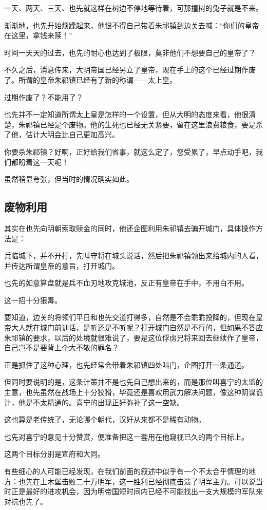 \begin{multicols}{\theparacolNo}
一天、两天、三天、也先就这样在树边不停地等待着，可那撞树的兔子就是不来。

渐渐地，也先开始烦躁起来，他恨不得自己带着朱祁镇到边关去喊：“你们的皇帝在这里，拿钱来赎！”

时间一天天的过去，也先的耐心也达到了极限，莫非他们不想要自己的皇帝了？

不久之后，消息传来，大明帝国已经另立了皇帝，现在手上的这个已经过期作废了。所谓的皇帝朱祁镇已经有了新的称谓——太上皇。

过期作废了？不能用了？

也先并不一定知道所谓太上皇是怎样的一个设置，但从大明的态度来看，他很清楚，朱祁镇已经是个废物。他的生死也已经无关紧要，留在这里浪费粮食，要是杀了他，估计大明会比自己更加高兴。

你要杀朱祁镇？好啊，正好给我们省事，就这么定了，您受累了，早点动手吧，我们都盼着这一天呢！

虽然稍显夸张，但当时的情况确实如此。

\subsection{废物利用}
其实在也先向明朝索取赎金的同时，他还企图利用朱祁镇去骗开城门，具体操作方法是：

兵临城下，并不开打，先叫守将在城头说话，然后把朱祁镇领出来给城内的人看，并传达所谓皇帝的意旨，打开城门。

也先的如意算盘就是兵不血刃地攻克城池，反正有皇帝在手中，不用白不用。

这一招十分狠毒。

要知道，边关的将领们平日和也先交道打得多，自然是不会乖乖投降的，但现在皇帝大人就在城门前训话，是听还是不听呢？打开城门自然是不行的，但如果不答应朱祁镇的要求，以后的处境就很难说了，要是这位俘虏兄将来回去继续作了皇帝，自己岂不是要背上个大不敬的罪名？

正是抓住了这种心理，也先经常会带着朱祁镇四处叫门，企图打开一条通道。

但同时要说明的是，这条计策并不是也先自己想出来的，而是那位叫喜宁的太监的主意，也先虽然在战场上十分狡猾，毕竟还是喜欢用武力解决问题，像这种阴谋诡计，他是不太精通的。喜宁的出现正好弥补了这一空缺。

这也算是老传统了，无论哪个朝代，汉奸从来都不是稀有动物。

也先对喜宁的意见十分赞赏，便准备把这一套用在他窥视已久的两个目标上。

这两个目标分别是宣府和大同。

有些细心的人可能已经发现，在我们前面的叙述中似乎有一个不太合乎情理的地方：也先在土木堡击败二十万明军，这一胜利已经彻底击溃了明军主力。可以说当时正是最好的进攻机会，因为明帝国短时间内已经不可能找出一支大规模的军队来对抗也先了。


\end{multicols}
